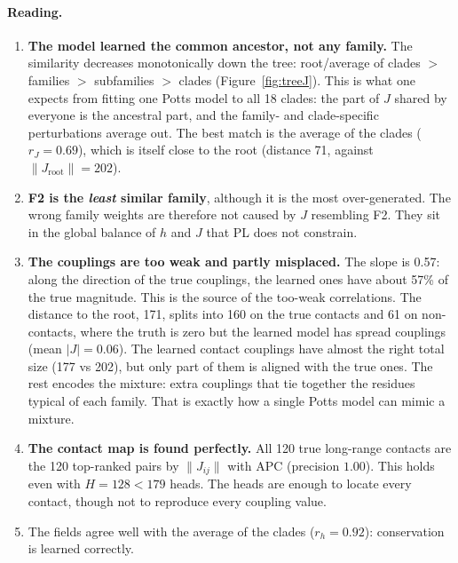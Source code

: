 \paragraph{Reading.}
\begin{enumerate}
\item \textbf{The model learned the common ancestor, not any family.} The similarity decreases
monotonically down the tree: root/average of clades $>$ families $>$ subfamilies $>$ clades
(Figure~\ref{fig:treeJ}). This is what one expects from fitting one Potts model to all 18 clades: the part of
$J$ shared by everyone is the ancestral part, and the family- and clade-specific perturbations average out.
The best match is the average of the clades ($r_J=0.69$), which is itself close to the root (distance 71,
against $\|J_{\text{root}}\|=202$).
\item \textbf{F2 is the \emph{least} similar family}, although it is the most over-generated. The wrong
family weights are therefore not caused by $J$ resembling F2. They sit in the global balance of $h$ and
$J$ that PL does not constrain.
\item \textbf{The couplings are too weak and partly misplaced.} The slope is 0.57: along the direction of
the true couplings, the learned ones have about 57\% of the true magnitude. This is the source of the
too-weak correlations. The distance to the root, 171, splits into 160 on the true contacts and 61 on
non-contacts, where the truth is zero but the learned model has spread couplings (mean $|J|=0.06$). The
learned contact couplings have almost the right total size (177 vs 202), but only part of them is aligned
with the true ones. The rest encodes the mixture: extra couplings that tie together the residues typical of
each family. That is exactly how a single Potts model can mimic a mixture.
\item \textbf{The contact map is found perfectly.} All 120 true long-range contacts are the 120 top-ranked
pairs by $\|J_{ij}\|$ with APC (precision $1.00$). This holds even with $H=128<179$ heads. The heads are
enough to locate every contact, though not to reproduce every coupling value.
\item The fields agree well with the average of the clades ($r_h=0.92$): conservation is learned correctly.
\end{enumerate}

